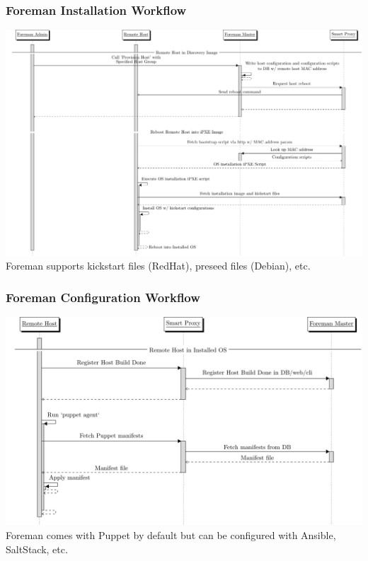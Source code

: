 \documentclass{beamer}
\begin{document}
\begin{frame}[fragile]
	\frametitle{Foreman Installation Workflow}

	\centering
	\includegraphics[width=\textwidth,height=\textheight-15mm,keepaspectratio]{installation_sd}
	\tiny
	Foreman supports kickstart files (RedHat), preseed files (Debian), etc.

\end{frame}

\begin{frame}[fragile]
	\frametitle{Foreman Configuration Workflow}

	\centering
	\includegraphics[width=\textwidth,height=\textheight-15mm,keepaspectratio]{configuration_sd}
	\tiny
	Foreman comes with Puppet by default but can be configured with Ansible, SaltStack, etc.

\end{frame}
\end{document}
